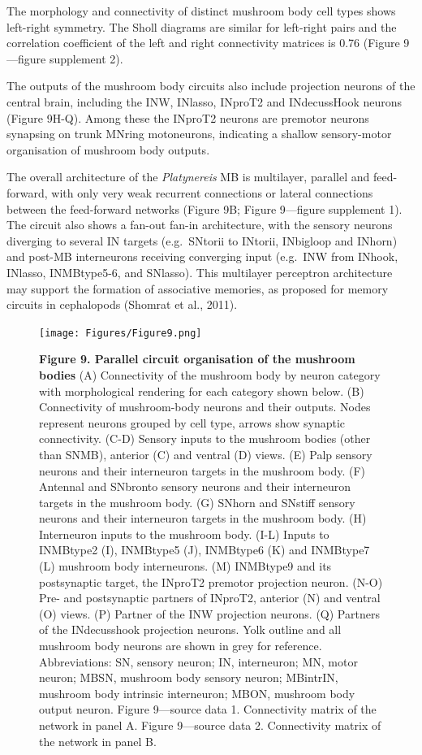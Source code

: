 \documentclass[
  11pt,
]{article}
\begin{document}
The morphology and connectivity of distinct mushroom body cell types
shows left-right symmetry. The Sholl diagrams are similar for left-right
pairs and the correlation coefficient of the left and right connectivity
matrices is 0.76 (Figure 9---figure supplement 2).

The outputs of the mushroom body circuits also include projection
neurons of the central brain, including the INW, INlasso, INproT2 and
INdecussHook neurons (Figure 9H-Q). Among these the INproT2 neurons are
premotor neurons synapsing on trunk MNring motoneurons, indicating a
shallow sensory-motor organisation of mushroom body outputs.

The overall architecture of the \emph{Platynereis} MB is multilayer,
parallel and feed-forward, with only very weak recurrent connections or
lateral connections between the feed-forward networks (Figure 9B; Figure
9---figure supplement 1). The circuit also shows a fan-out fan-in
architecture, with the sensory neurons diverging to several IN targets
(e.g.~SNtorii to INtorii, INbigloop and INhorn) and post-MB interneurons
receiving converging input (e.g.~INW from INhook, INlasso, INMBtype5-6,
and SNlasso). This multilayer perceptron architecture may support the
formation of associative memories, as proposed for memory circuits in
cephalopods (Shomrat et al., 2011).

\begin{figure}[H]

{\centering \texttt{[image: Figures/Figure9.png]}

}

\caption{\textbf{Figure 9. Parallel circuit organisation of the mushroom
bodies} (A) Connectivity of the mushroom body by neuron category with
morphological rendering for each category shown below. (B) Connectivity
of mushroom-body neurons and their outputs. Nodes represent neurons
grouped by cell type, arrows show synaptic connectivity. (C-D) Sensory
inputs to the mushroom bodies (other than SNMB), anterior (C) and
ventral (D) views. (E) Palp sensory neurons and their interneuron
targets in the mushroom body. (F) Antennal and SNbronto sensory neurons
and their interneuron targets in the mushroom body. (G) SNhorn and
SNstiff sensory neurons and their interneuron targets in the mushroom
body. (H) Interneuron inputs to the mushroom body. (I-L) Inputs to
INMBtype2 (I), INMBtype5 (J), INMBtype6 (K) and INMBtype7 (L) mushroom
body interneurons. (M) INMBtype9 and its postsynaptic target, the
INproT2 premotor projection neuron. (N-O) Pre- and postsynaptic partners
of INproT2, anterior (N) and ventral (O) views. (P) Partner of the INW
projection neurons. (Q) Partners of the INdecusshook projection neurons.
Yolk outline and all mushroom body neurons are shown in grey for
reference. Abbreviations: SN, sensory neuron; IN, interneuron; MN, motor
neuron; MBSN, mushroom body sensory neuron; MBintrIN, mushroom body
intrinsic interneuron; MBON, mushroom body output neuron. Figure
9---source data 1. Connectivity matrix of the network in panel A. Figure
9---source data 2. Connectivity matrix of the network in panel B.}

\end{figure}%
\end{document}
